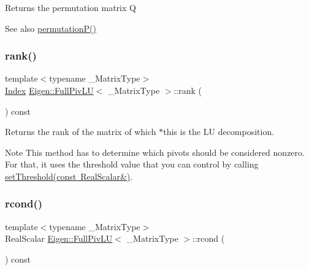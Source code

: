 \begin{DoxyReturn}{Returns}
the permutation matrix Q
\end{DoxyReturn}
\begin{DoxySeeAlso}{See also}
\mbox{\hyperlink{class_eigen_1_1_full_piv_l_u_a09274c82240f6441af5e6c99e24e756d}{permutation\+P()}} 
\end{DoxySeeAlso}
\mbox{\label{class_eigen_1_1_full_piv_l_u_a67a870aa69e699e058d04802ba0bdad9}} 
\subsubsection{\texorpdfstring{rank()}{rank()}}
{\footnotesize\ttfamily template$<$typename \+\_\+\+Matrix\+Type$>$ \\
\mbox{\hyperlink{struct_eigen_1_1_eigen_base_a554f30542cc2316add4b1ea0a492ff02}{Index}} \mbox{\hyperlink{class_eigen_1_1_full_piv_l_u}{Eigen\+::\+Full\+Piv\+LU}}$<$ \+\_\+\+Matrix\+Type $>$\+::rank (\begin{DoxyParamCaption}{ }\end{DoxyParamCaption}) const\hspace{0.3cm}{\ttfamily [inline]}}

\begin{DoxyReturn}{Returns}
the rank of the matrix of which $\ast$this is the LU decomposition.
\end{DoxyReturn}
\begin{DoxyNote}{Note}
This method has to determine which pivots should be considered nonzero. For that, it uses the threshold value that you can control by calling \mbox{\hyperlink{class_eigen_1_1_full_piv_l_u_a414592d82de98f5bd075965caf56d681}{set\+Threshold(const Real\+Scalar\&)}}. 
\end{DoxyNote}
\mbox{\label{class_eigen_1_1_full_piv_l_u_a0bc63f910960dc3e35acecc8442025b6}} 
\subsubsection{\texorpdfstring{rcond()}{rcond()}}
{\footnotesize\ttfamily template$<$typename \+\_\+\+Matrix\+Type$>$ \\
Real\+Scalar \mbox{\hyperlink{class_eigen_1_1_full_piv_l_u}{Eigen\+::\+Full\+Piv\+LU}}$<$ \+\_\+\+Matrix\+Type $>$\+::rcond (\begin{DoxyParamCaption}{ }\end{DoxyParamCaption}) const\hspace{0.3cm}{\ttfamily [inline]}}

